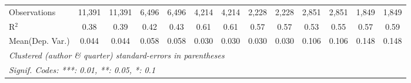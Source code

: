 \begin{tabular}{lcccccccccccc}
   Observations                             & 11,391       & 11,391         & 6,496         & 6,496         & 4,214   & 4,214    & 2,228   & 2,228    & 2,851         & 2,851          & 1,849        & 1,849\\  
   R$^2$                                    & 0.38         & 0.39           & 0.42          & 0.43          & 0.61    & 0.61     & 0.57    & 0.57     & 0.53          & 0.55           & 0.57         & 0.59\\  
Mean(Dep. Var.) & 0.044 & 0.044 & 0.058 & 0.058 & 0.030 & 0.030 & 0.030 & 0.030 & 0.106 & 0.106 & 0.148 & 0.148 \\
   \midrule \midrule
   \multicolumn{13}{l}{\emph{Clustered (author \& quarter) standard-errors in parentheses}}\\
   \multicolumn{13}{l}{\emph{Signif. Codes: ***: 0.01, **: 0.05, *: 0.1}}\\
\end{tabular}
\par\endgroup
